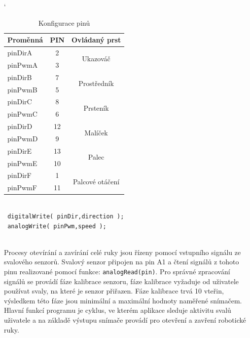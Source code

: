 \documentclass[thesis=B,czech]{FITthesis}[2012/06/26]
\begin{document}
\begin{table}[H]
\centering
\catcode`
\caption{Konfigurace pinů}
\label{tab:VarDescr}
\begin{tabular}{|l|c|c|}
\hline
\textbf{Proměnná} & \textbf{PIN} & \textbf{Ovládaný prst}           \\ \hline \hline
pinDirA           & 2            & \multirow{2}{*}{Ukazováč}        \\ \cline{1-2}
pinPwmA           & 3            &                                  \\ \hline
pinDirB           & 7            & \multirow{2}{*}{Prostředník}     \\ \cline{1-2}
pinPwmB           & 5            &                                  \\ \hline
pinDirC           & 8            & \multirow{2}{*}{Prsteník}        \\ \cline{1-2}
pinPwmC           & 6            &                                  \\ \hline
pinDirD           & 12           & \multirow{2}{*}{Malíček}         \\ \cline{1-2}
pinPwmD           & 9            &                                  \\ \hline
pinDirE           & 13           & \multirow{2}{*}{Palec}           \\ \cline{1-2}
pinPwmE           & 10           &                                  \\ \hline
pinDirF           & 1            & \multirow{2}{*}{Palcové otáčení} \\ \cline{1-2}
pinPwmF           & 11           &                                  \\ \hline
\end{tabular}
\end{table}

\newpage

\begin{lstlisting}[caption={Funkce pro ovládání motoru},label={code:HandCont}]

 digitalWrite( pinDir,direction );
 analogWrite( pinPwm,speed ); 
 
\end{lstlisting}



Procesy otevírání a zavírání celé ruky jsou řízeny pomocí vstupního signálu ze svalového senzorů. Svalový senzor připojen na pin A1 a čtení signálů z tohoto pinu realizované pomocí funkce: \texttt{analogRead(pin)}. Pro správné zpracování signálů se provádí fáze kalibrace senzoru, fáze kalibrace vyžaduje od uživatele používat svaly, na které je senzor přiřazen. Fáze kalibrace trvá 10 vteřin, výsledkem této fáze jsou minimální a maximální hodnoty naměřené snímačem. Hlavní funkcí programu je cyklus, ve kterém aplikace sleduje aktivitu svalů uživatele a na základě výstupu snímače provádí pro otevření a zavření robotické ruky.
\end{document}
